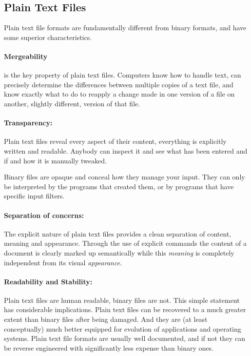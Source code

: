 \documentclass[11pt,a4paper]{article}
\begin{document}
\subsection{Plain Text Files}
Plain text file formats are fundamentally different from binary formats,
and have some superior characteristics.

\paragraph{Mergeability}
is the key property of plain text files.  Computers know how to handle text,
can precisely determine the differences between multiple copies of a text file,
and know exactly what to do to reapply a change made in one version of a file
on another, slightly different, version of that file.

\paragraph{Transparency:}
Plain text files reveal every aspect of their content, everything is explicitly written
and readable. Anybody can inspect it and see what has been entered and if and how it is
manually tweaked. 

Binary files are opaque and conceal how they manage your input. They can only be
interpreted by the programs that created them, or by programs that have specific input filters.

\paragraph{Separation of concerns:}
The explicit nature of plain text files provides a clean separation of content, meaning
and appearance. Through the use of explicit commands the content
of a document is clearly marked up semantically while this \emph{meaning} is completely
independent from its visual \emph{appearance}.

\paragraph{Readability and Stability:}
Plain text files are human readable, binary files are not. This simple statement has
considerable implications. Plain text files can be recovered to a much greater extent
than binary files after being damaged. And they are (at least conceptually) much better
equipped for evolution of applications and operating systems. Plain text file formats are
usually well documented, and if not they can be reverse engineered with significantly
less expense than binary ones.
\end{document}

